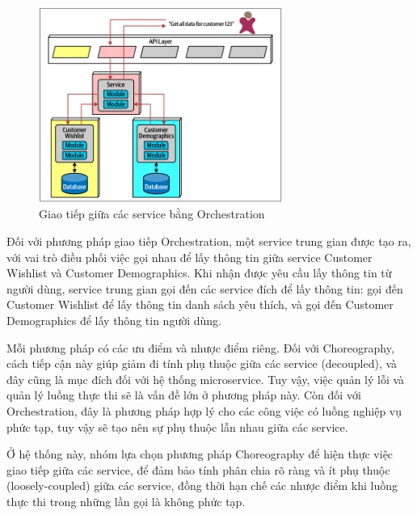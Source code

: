 \begin{figure}[!htp]
	\centering
	\includegraphics[width=8cm]{img/Architecture/orchestration.PNG}
	\newline
	\caption{Giao tiếp giữa các service bằng Orchestration \cite{archOrchestration}}
\end{figure}
Đối với phương pháp giao tiếp Orchestration, một service trung gian được tạo ra, với vai trò điều phối việc gọi nhau để lấy thông tin giữa service Customer Wishlist và Customer Demographics. Khi nhận được yêu cầu lấy thông tin từ người dùng, service trung gian gọi đến các service đích để lấy thông tin: gọi đến Customer Wishlist để lấy thông tin danh sách yêu thích, và gọi đến Customer Demographics để lấy thông tin người dùng.

\par Mỗi phương pháp có các ưu điểm và nhược điểm riêng. Đối với Choreography, cách tiếp cận này giúp giảm đi tính phụ thuộc giữa các service (decoupled), và đây cũng là mục đích đối với hệ thống microservice. Tuy vậy, việc quản lý lỗi và quản lý luồng thực thi sẽ là vấn đề lớn ở phương pháp này. Còn đối với Orchestration, đây là phương pháp hợp lý cho các công việc có luồng nghiệp vụ phức tạp, tuy vậy sẽ tạo nên sự phụ thuộc lẫn nhau giữa các service.

\par Ở hệ thống này, nhóm lựa chọn phương pháp Choreography để hiện thực việc giao tiếp giữa các service, để đảm bảo tính phân chia rõ ràng và ít phụ thuộc (loosely-coupled) giữa các service, đồng thời hạn chế các nhược điểm khi luồng thực thi trong những lần gọi là không phức tạp.

